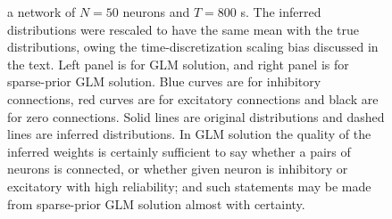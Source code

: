 \begin{figure}
{a network of $N=50$ neurons and $T=800$ s. The inferred distributions were rescaled
to have the same mean with the true distributions, owing the time-discretization scaling bias discussed in the text.  Left panel is for GLM solution, and right panel is for sparse-prior GLM solution.  Blue curves are for inhibitory connections, red curves are for excitatory connections and black are for zero connections. Solid lines are original distributions and dashed lines are inferred distributions. In GLM solution the quality of the inferred weights is certainly sufficient to say whether a pairs of neurons is connected, or whether given neuron is inhibitory or excitatory with high reliability; and such statements may be made from sparse-prior GLM solution almost with certainty.}
\label{fig:distr}
\end{figure}

